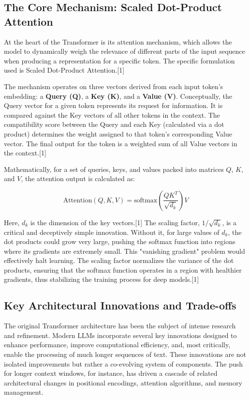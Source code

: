 \documentclass[12pt, a4paper]{article}
\begin{document}
\subsection{The Core Mechanism: Scaled Dot-Product Attention}

At the heart of the Transformer is its attention mechanism, which allows the model to dynamically weigh the relevance of different parts of the input sequence when producing a representation for a specific token. The specific formulation used is Scaled Dot-Product Attention.[1]

The mechanism operates on three vectors derived from each input token's embedding: a \textbf{Query (Q)}, a \textbf{Key (K)}, and a \textbf{Value (V)}. Conceptually, the Query vector for a given token represents its request for information. It is compared against the Key vectors of all other tokens in the context. The compatibility score between the Query and each Key (calculated via a dot product) determines the weight assigned to that token's corresponding Value vector. The final output for the token is a weighted sum of all Value vectors in the context.[1]

Mathematically, for a set of queries, keys, and values packed into matrices $Q$, $K$, and $V$, the attention output is calculated as:

$$\text{Attention}(Q, K, V) = \text{softmax}\left(\frac{QK^T}{\sqrt{d_k}}\right)V$$

Here, $d_k$ is the dimension of the key vectors.[1] The scaling factor, $1/\sqrt{d_k}$, is a critical and deceptively simple innovation. Without it, for large values of $d_k$, the dot products could grow very large, pushing the softmax function into regions where its gradients are extremely small. This "vanishing gradient" problem would effectively halt learning. The scaling factor normalizes the variance of the dot products, ensuring that the softmax function operates in a region with healthier gradients, thus stabilizing the training process for deep models.[1]

\subsection{Key Architectural Innovations and Trade-offs}

The original Transformer architecture has been the subject of intense research and refinement. Modern LLMs incorporate several key innovations designed to enhance performance, improve computational efficiency, and, most critically, enable the processing of much longer sequences of text. These innovations are not isolated improvements but rather a co-evolving system of components. The push for longer context windows, for instance, has driven a cascade of related architectural changes in positional encodings, attention algorithms, and memory management.
\end{document}
